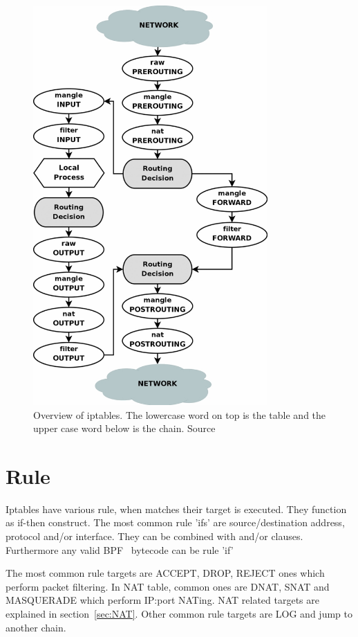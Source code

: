 \documentclass[times, utf8, seminar, english]{fer}
\begin{document}
\begin{figure}
    \centering
    \includegraphics[width=0.8\textwidth]{tables_traverse}
    \caption{Overview of iptables. The lowercase word on top is the table and the upper case word below is the chain. Source~\cite{Iptables99:online}}
    \label{fig:iptables_traverse}
\end{figure}

\section{Rule}
    Iptables have various rule, when matches their target is executed. They function as if-then construct. The most common rule 'ifs' are source/destination address, protocol and/or interface. They can be combined with and/or clauses. Furthermore any valid BPF~\cite{BPFthefo6:online} bytecode can be rule 'if'

    The most common rule targets are ACCEPT, DROP, REJECT ones which perform packet filtering. In NAT table, common ones are DNAT, SNAT and MASQUERADE which perform IP:port NATing. NAT related targets are explained in section~\ref{sec:NAT}. Other common rule targets are LOG and jump to another chain.
\end{document}
